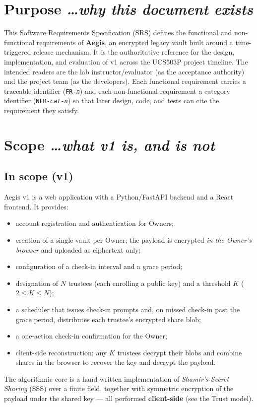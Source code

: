 \documentclass[11pt,a4paper]{article}
\newcommand{\BvrHint}[1]{%
  {\normalfont\normalsize\itshape\hfill #1}}
\newcommand{\ReqID}[1]{\texttt{#1}}
\begin{document}
\section{Purpose \BvrHint{\ldots why this document exists}}
This Software Requirements Specification (SRS) defines the functional and
non-functional requirements of \textbf{Aegis}, an encrypted legacy vault built
around a time-triggered release mechanism. It is the authoritative reference
for the design, implementation, and evaluation of v1 across the UCS503P
project timeline. The intended readers are the lab instructor/evaluator (as the
acceptance authority) and the project team (as the developers). Each functional
requirement carries a traceable identifier (\ReqID{FR-\textit{n}}) and each
non-functional requirement a category identifier (\ReqID{NFR-\textit{cat}-\textit{n}})
so that later design, code, and tests can cite the requirement they satisfy.

\section{Scope \BvrHint{\ldots what v1 is, and is not}}
\subsection{In scope (v1)}
Aegis v1 is a web application with a Python/FastAPI backend and a React
frontend. It provides:
\begin{itemize}[leftmargin=0.7cm]
  \item account registration and authentication for Owners;
  \item creation of a single vault per Owner; the payload is encrypted \emph{in
    the Owner's browser} and uploaded as ciphertext only;
  \item configuration of a check-in interval and a grace period;
  \item designation of $N$ trustees (each enrolling a public key) and a
    threshold $K$ ($2 \le K \le N$);
  \item a scheduler that issues check-in prompts and, on missed check-in past
    the grace period, distributes each trustee's encrypted share blob;
  \item a one-action check-in confirmation for the Owner;
  \item client-side reconstruction: any $K$ trustees decrypt their blobs and
    combine shares in the browser to recover the key and decrypt the payload.
\end{itemize}
The algorithmic core is a hand-written implementation of \emph{Shamir's Secret
Sharing} (SSS) over a finite field, together with symmetric encryption of the
payload under the shared key --- all performed \textbf{client-side} (see the
Trust model).
\end{document}
